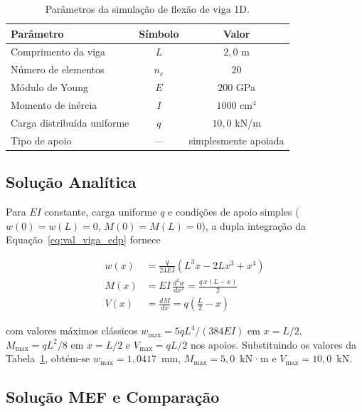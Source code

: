 \begin{table}[htbp]
    \centering
    \caption{Parâmetros da simulação de flexão de viga 1D.}
    \label{tab:val_viga_params}
    \begin{tabular}{lcc}
        \hline
        \textbf{Parâmetro} & \textbf{Símbolo} & \textbf{Valor} \\
        \hline
        Comprimento da viga            & $L$   & $2{,}0$ m           \\
        Número de elementos            & $n_e$ & $20$                \\
        Módulo de Young                & $E$   & $200$ GPa           \\
        Momento de inércia             & $I$   & $1000$ cm$^{4}$     \\
        Carga distribuída uniforme     & $q$   & $10{,}0$ kN/m       \\
        Tipo de apoio                  & ---   & simplesmente apoiada \\
        \hline
    \end{tabular}
\end{table}

\subsection{Solução Analítica}

Para $E I$ constante, carga uniforme $q$ e condições de apoio simples ($w(0) = w(L) = 0$, $M(0) = M(L) = 0$), a dupla integração da Equação~\eqref{eq:val_viga_edp} fornece

\begin{align}
    w(x) &= \frac{q}{24 E I} \left( L^3 x - 2 L x^3 + x^4 \right)
    \label{eq:val_viga_w} \\
    M(x) &= E I \, \frac{d^2 w}{dx^2} = \frac{q \, x (L - x)}{2}
    \label{eq:val_viga_M} \\
    V(x) &= \frac{dM}{dx} = q \left( \frac{L}{2} - x \right)
    \label{eq:val_viga_V}
\end{align}

\noindent com valores máximos clássicos $w_{\max} = 5 q L^4 / (384 E I)$ em $x = L/2$, $M_{\max} = q L^2 / 8$ em $x = L/2$ e $V_{\max} = q L / 2$ nos apoios. Substituindo os valores da Tabela~\ref{tab:val_viga_params}, obtém-se $w_{\max} = 1{,}0417$~mm, $M_{\max} = 5{,}0$~kN·m e $V_{\max} = 10{,}0$~kN.

\subsection{Solução MEF e Comparação}

